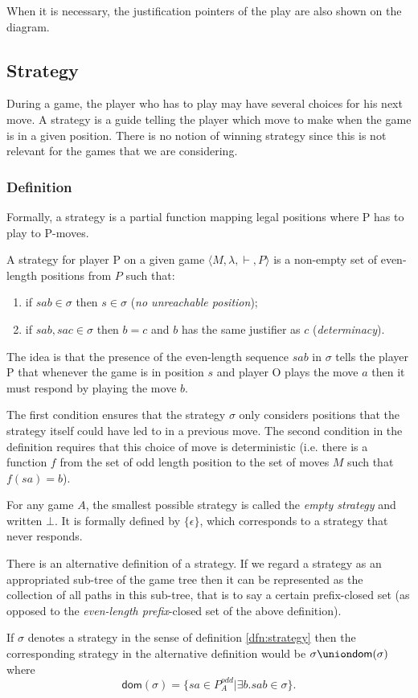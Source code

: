 When it is necessary, the justification pointers of the play are
also shown on the diagram.


\subsection{Strategy}

During a game, the player who has to play may have several choices
for his next move. A strategy is a guide telling the player which move to make when the
game is in a given position. There is no notion of winning strategy since this is
not relevant for the games that we are considering.

\subsubsection{Definition}
Formally, a strategy is a partial function mapping legal positions
where P has to play to P-moves.
\begin{definition}[Strategy]
\label{dfn:strategy}
A strategy for player P on a given game $\langle M, \lambda, \vdash, P \rangle$ is a
non-empty set of even-length positions from $P$ such that:
\begin{enumerate}
\item if $sab \in \sigma$ then $s \in \sigma$ (\emph{no unreachable
position});
\item if $sab, sac \in \sigma$ then $b = c$  and $b$ has the same justifier as
$c$ (\emph{determinacy}).
\end{enumerate}
\end{definition}

The idea is that the presence of the even-length sequence $s a b$ in
$\sigma$ tells the player P that whenever the game is in position
$s$ and player O plays the move $a$ then it must respond by playing
the move $b$.

The first condition ensures that the strategy $\sigma$ only
considers positions that the strategy itself could have led to in a
previous move. The second condition in the definition requires that
this choice of move is deterministic (i.e. there is a function $f$
from the set of odd length position to the set of moves $M$ such
that $f(s a) = b$).


For any game $A$, the smallest possible strategy is called the
\emph{empty strategy} and written $\bot$. It is formally defined by
$\{ \epsilon \}$, which corresponds to a strategy that never
responds.


\begin{remark}
\label{rem:atlern_strategy} There is an alternative definition of a
strategy. If we regard a strategy as an appropriated sub-tree of the
game tree then it can be represented as the collection of all paths
in this sub-tree, that is to say a certain prefix-closed set (as
opposed to the \emph{even-length prefix}-closed set of the above
definition).

If $\sigma$ denotes a strategy in the sense of definition \ref{dfn:strategy} then the corresponding strategy in the alternative definition would be
$\sigma \union \textsf{dom}(\sigma)$ where
$$\textsf{dom}(\sigma) = \{ sa \in P_A^{odd} | \exists b . sab \in \sigma \}.$$
\end{remark}


